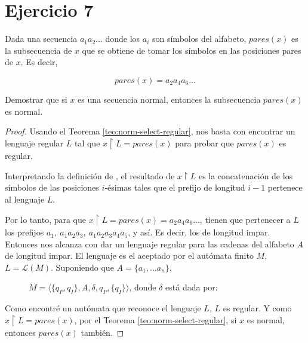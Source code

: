 \documentclass{article}
\theoremstyle{definition} %
\newcommand{\select}{\upharpoonright}
\begin{document}
\section*{Ejercicio 7}

Dada una secuencia $a_1 a_2 \dots$ donde los $a_i$ son símbolos del alfabeto,
$pares(x)$ es la subsecuencia de $x$ que se obtiene de tomar los símbolos en las
posiciones pares de $x$. Es decir,

\[
    pares(x) = a_2 a_4 a_6 \dots
\]

Demostrar que si $x$ es una secuencia normal, entonces la subsecuencia
$pares(x)$ es normal.

\begin{proof}
    Usando el Teorema \ref{teo:norm-select-regular}, nos basta con encontrar un
    lenguaje regular $L$ tal que $x \select L = pares(x)$ para probar que
    $pares(x)$ es regular.

    Interpretando la definición de , el resultado
    de $x \select L$ es la concatenación de los símbolos de las posiciones
    $i$-ésimas tales que el prefijo de longitud $i - 1$ pertenece al lenguaje
    $L$.

    Por lo tanto, para que $x \select L = pares(x) = a_2 a_4 a_6 \dots$, tienen
    que pertenecer a $L$ los prefijos $a_1,\ a_1 a_2 a_3,\ a_1 a_2 a_3 a_4 a_5$,
    y así. Es decir, los de longitud impar. Entonces nos alcanza con dar un
    lenguaje regular para las cadenas del alfabeto $A$ de longitud impar. El
    lenguaje es el aceptado por el autómata finito $M$, $L = \mathcal{L}(M)$.
    Suponiendo que $A = \{ a_1, \dots a_n \}$,

    \begin{figure}[H]
        \centering
        \(
            M = \langle
                \{ q_P, q_I \},
                A,
                \delta,
                q_P,
                \{ q_I \}
            \rangle
        \), donde $\delta$ está dada por:

        \vspace{0.5cm}

    \end{figure}

    Como encontré un autómata que reconoce el lenguaje $L$, $L$ es regular. Y
    como $x \select L = pares(x)$, por el Teorema \ref{teo:norm-select-regular},
    si $x$ es normal, entonces $pares(x)$ también.

\end{proof}
\end{document}
